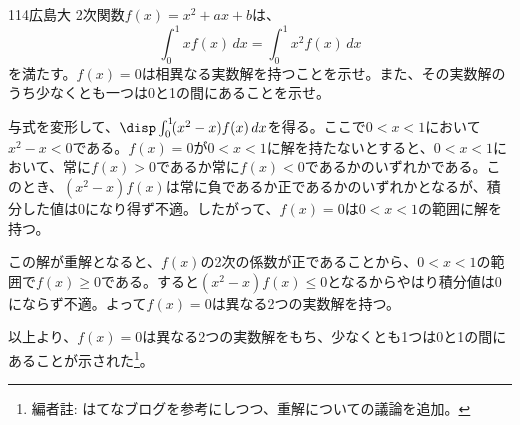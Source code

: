 \begin{thm}{114}{}{広島大}
 2次関数$f(x)=x^2+ax+b$は、
 \[ \int_0^1\! xf(x) \,dx = \int_0^1\! x^2f(x) \,dx \]
 を満たす。$f(x)=0$は相異なる実数解を持つことを示せ。また、その実数解のうち少なくとも一つは0と1の間にあることを示せ。
\end{thm}

与式を変形して、$\disp \int_0^1\!(x^2-x)f(x) \,dx$を得る。ここで$0<x<1$において$x^2-x<0$である。$f(x)=0$が$0<x<1$に解を持たないとすると、$0<x<1$において、常に$f(x)>0$であるか常に$f(x)<0$であるかのいずれかである。このとき、$(x^2-x)f(x)$は常に負であるか正であるかのいずれかとなるが、積分した値は0になり得ず不適。したがって、$f(x)=0$は$0<x<1$の範囲に解を持つ。

この解が重解となると、$f(x)$の2次の係数が正であることから、$0<x<1$の範囲で$f(x)\ge 0$である。すると$(x^2-x)f(x)\le 0$となるからやはり積分値は0にならず不適。よって$f(x)=0$は異なる2つの実数解を持つ。

以上より、$f(x)=0$は異なる2つの実数解をもち、少なくとも1つは0と1の間にあることが示された\footnote{編者註: はてなブログを参考にしつつ、重解についての議論を追加。}。
